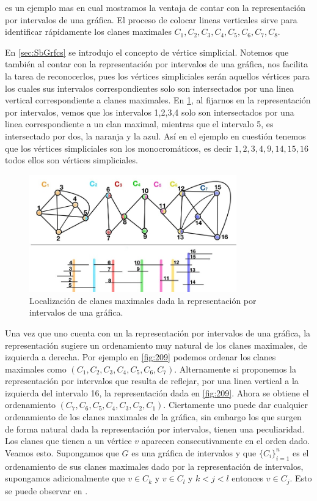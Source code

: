  es un ejemplo mas en cual mostramos la ventaja de contar con la representación por intervalos de una gráfica. El proceso de colocar lineas verticales sirve para identificar rápidamente los clanes maximales $C_1,C_2, C_3, C_4, C_5, C_6, C_7, C_8$.

En \cref{sec:SbGrfcs} se introdujo el concepto de vértice simplicial. Notemos que también al contar con la representación por intervalos de una gráfica, nos facilita la tarea de reconocerlos, pues los vértices simpliciales serán aquellos vértices para los cuales sus intervalos  correspondientes solo son intersectados por una linea vertical correspondiente a clanes maximales. En \cref{fig:MaxClqs02}, al fijarnos en la representación por intervalos, vemos que los intervalos 1,2,3,4 solo son intersectados por una linea correspondiente a un clan maximal, mientras que el intervalo 5, es intersectado por dos, la naranja y la azul. Así en el ejemplo en cuestión tenemos que los vértices simpliciales son los monocrom\'aticos, es decir $1,2,3,4,9,14,15,16$ todos ellos son vértices simpliciales.

\begin{figure}[H]
  \centering
  \includegraphics[width=0.8\textwidth]{recursos/capturas/209.jpg}
  \caption{Localización de clanes maximales dada la representación por intervalos de una gráfica.}
  \label{fig:MaxClqs02}
\end{figure}

Una vez que uno cuenta con un la representación por intervalos de una gráfica, la representación sugiere un ordenamiento muy natural de los clanes maximales, de izquierda a derecha. Por ejemplo en \cref{fig:209} podemos ordenar los clanes maximales como $(C_1,C_2, C_3, C_4, C_5, C_6, C_7)$. Alternamente si proponemos la representación por intervalos que resulta de reflejar, por una linea vertical a la izquierda del intervalo 16, la representación dada en \cref{fig:209}. Ahora se obtiene el ordenamiento $(C_7,C_6,C_5,C_4,C_3,C_2,C_1)$. Ciertamente uno puede dar cualquier ordenamiento de los clanes maximales de la gráfica, sin embargo los que surgen de forma natural dada la representación por intervalos, tienen una peculiaridad. Los clanes que tienen a un vértice $v$ aparecen consecutivamente en el orden dado. Veamos esto. Supongamos que $G$ es una gráfica de intervalos y que $\{C_i\}_{i=1} ^n$ es el ordenamiento de sus clanes maximales dado por la representación de intervalos, supongamos adicionalmente que $v\in C_k$ y $v\in C_l$ y $k<j<l$ entonces $v\in C_j$. Esto se puede observar en . 



